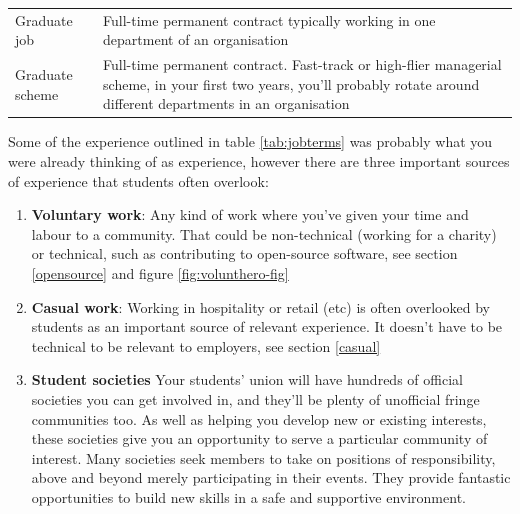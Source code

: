 \documentclass[
]{book}
\providecommand{\tightlist}{%
  \setlength{\itemsep}{0pt}\setlength{\parskip}{0pt}}
\begin{document}
\begin{table}
\begin{tabular}[t]{ll}
Graduate job & Full-time permanent contract typically working in one department of an organisation\\
Graduate scheme & Full-time permanent contract. Fast-track or high-flier managerial scheme, in your first two years, you'll probably rotate around different departments in an organisation\\
\bottomrule
\end{tabular}
\end{table}

Some of the experience outlined in table \ref{tab:jobterms} was probably what you were already thinking of as experience, however there are three important sources of experience that students often overlook:

\begin{enumerate}
\def\labelenumi{\arabic{enumi}.}
\tightlist
\item
  \textbf{Voluntary work}: Any kind of work where you've given your time and labour to a community. That could be non-technical (working for a charity) or technical, such as contributing to open-source software, see section \ref{opensource} and figure \ref{fig:volunthero-fig}
\item
  \textbf{Casual work}: Working in hospitality or retail (etc) is often overlooked by students as an important source of relevant experience. It doesn't have to be technical to be relevant to employers, see section \ref{casual}
\item
  \textbf{Student societies} Your students' union will have hundreds of official societies you can get involved in, and they'll be plenty of unofficial fringe communities too. As well as helping you develop new or existing interests, these societies give you an opportunity to serve a particular community of interest. Many societies seek members to take on positions of responsibility, above and beyond merely participating in their events. They provide fantastic opportunities to build new skills in a safe and supportive environment.
\end{enumerate}
\end{document}
